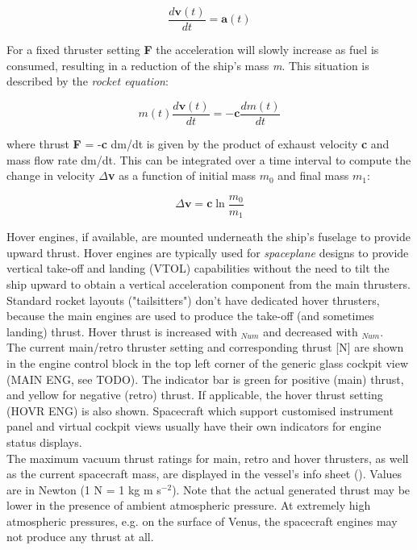 \documentclass[Orbiter User Manual.tex]{subfiles}
\begin{document}
\[ \frac{d\textbf{v}(t)}{dt} = \textbf{a}(t) \]

\noindent
For a fixed thruster setting \textbf{F} the acceleration will slowly increase as fuel is consumed, resulting in a reduction of the ship's mass \textit{m}. This situation is described by the \textit{rocket equation}:

\[ m(t) \frac{d\textbf{v}(t)}{dt} = - \textbf{c} \frac{dm(t)}{dt} \]

\noindent
where thrust \textbf{F} = -\textbf{c} dm/dt is given by the product of exhaust velocity \textbf{c} and mass flow rate dm/dt. This can be integrated over a time interval to compute the change in velocity $\Delta$\textbf{v} as a function of initial mass $m_{0}$ and final mass $m_{1}$:


\[ \Delta \textbf{v} = \textbf{c} \ln \frac{m_{0}}{m_{1}} \]

\noindent
Hover engines, if available, are mounted underneath the ship's fuselage to provide upward thrust. Hover engines are typically used for \textit{spaceplane} designs to provide vertical take-off and landing (VTOL) capabilities without the need to tilt the ship upward to obtain a vertical acceleration component from the main thrusters. Standard rocket layouts ("tailsitters") don't have dedicated hover thrusters, because the main engines are used to produce the take-off (and sometimes landing) thrust. Hover thrust is increased with $_{Num}$ and decreased with $_{Num}$.\\
The current main/retro thruster setting and corresponding thrust [N] are shown in the engine control block in the top left corner of the generic glass cockpit view (MAIN ENG, see TODO). The indicator bar is green for positive (main) thrust, and yellow for negative (retro) thrust. If applicable, the hover thrust setting (HOVR ENG) is also shown. Spacecraft which support customised instrument panel and virtual cockpit views usually have their own indicators for engine status displays.\\
The maximum vacuum thrust ratings for main, retro and hover thrusters, as well as the current spacecraft mass, are displayed in the vessel's info sheet (\Ctrl{}). Values are in Newton (1 N = 1 kg m s$^{-2}$). Note that the actual generated thrust may be lower in the presence of ambient atmospheric pressure. At extremely high atmospheric pressures, e.g. on the surface of Venus, the spacecraft engines may not produce any thrust at all.
\end{document}
